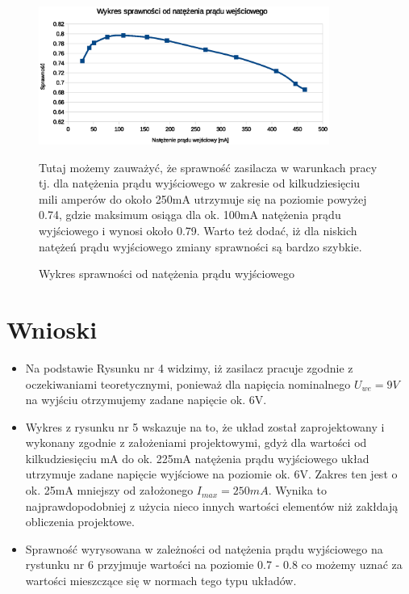 \documentclass[a4paper,12pt]{article}
\begin{document}
\begin{figure}[h!]
  \begin{center}
  \includegraphics[width=0.85\textwidth]{spr_Iwy.eps}
  \caption{Wykres sprawności od natężenia prądu wyjściowego}
  \end{center}
  
  Tutaj możemy zauważyć, że sprawność zasilacza w warunkach pracy tj. dla natężenia prądu wyjściowego w zakresie od
kilkudziesięciu mili amperów do około 250mA utrzymuje się na poziomie powyżej 0.74, gdzie maksimum osiąga 
dla ok. 100mA natężenia prądu wyjściowego i wynosi około 0.79.
Warto też dodać, iż dla niskich natężeń prądu wyjściowego zmiany sprawności są bardzo szybkie.
\end{figure}



\section {Wnioski}

\begin{itemize}
  \item Na podstawie Rysunku nr 4 widzimy, iż zasilacz pracuje zgodnie z oczekiwaniami teoretycznymi, ponieważ dla 
	napięcia nominalnego $U_{we} = 9V$ na wyjściu otrzymujemy zadane napięcie ok. 6V.
  \item Wykres z rysunku nr 5 wskazuje na to, że układ został zaprojektowany i wykonany zgodnie z założeniami
	projektowymi, gdyż dla wartości od kilkudziesięciu mA do ok. 225mA natężenia prądu wyjściowego 
	układ utrzymuje zadane napięcie wyjściowe na poziomie ok. 6V. Zakres ten jest o ok. 25mA mniejszy
	od założonego $I_{max} = 250mA$. Wynika to najprawdopodobniej z użycia nieco innych wartości
	elementów niż zakłdają obliczenia projektowe.
  \item Sprawność wyrysowana w zależności od natężenia prądu wyjściowego na rystunku nr 6 przyjmuje 
	wartości na poziomie 0.7 - 0.8 co możemy uznać za wartości mieszczące się w normach tego typu układów.
\end{itemize}
\end{document}
